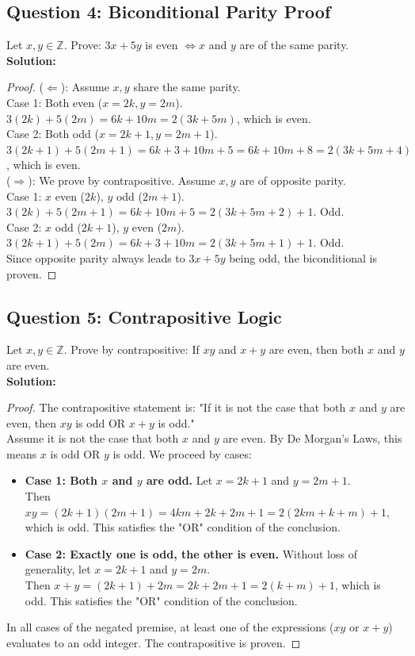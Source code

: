 \documentclass[11pt]{article}
\begin{document}
\subsection*{Question 4: Biconditional Parity Proof}
Let $x,y \in \mathbb{Z}$. Prove: $3x + 5y$ is even $\Leftrightarrow x$ and $y$ are of the same parity.\\
\textbf{Solution:}
\begin{proof}
($\Leftarrow$): Assume $x,y$ share the same parity. \\
Case 1: Both even ($x=2k, y=2m$). $3(2k) + 5(2m) = 6k + 10m = 2(3k + 5m)$, which is even. \\
Case 2: Both odd ($x=2k+1, y=2m+1$). $3(2k+1) + 5(2m+1) = 6k + 3 + 10m + 5 = 6k + 10m + 8 = 2(3k + 5m + 4)$, which is even. \\
($\Rightarrow$): We prove by contrapositive. Assume $x,y$ are of opposite parity. \\
Case 1: $x$ even ($2k$), $y$ odd ($2m+1$). $3(2k) + 5(2m+1) = 6k + 10m + 5 = 2(3k+5m+2)+1$. Odd. \\
Case 2: $x$ odd ($2k+1$), $y$ even ($2m$). $3(2k+1) + 5(2m) = 6k + 3 + 10m = 2(3k+5m+1)+1$. Odd. \\
Since opposite parity always leads to $3x+5y$ being odd, the biconditional is proven.
\end{proof}

\subsection*{Question 5: Contrapositive Logic}
Let $x,y \in \mathbb{Z}$. Prove by contrapositive: If $xy$ and $x+y$ are even, then both $x$ and $y$ are even.\\
\textbf{Solution:}
\begin{proof}
The contrapositive statement is: "If it is not the case that both $x$ and $y$ are even, then $xy$ is odd OR $x+y$ is odd." \\
Assume it is not the case that both $x$ and $y$ are even. By De Morgan's Laws, this means $x$ is odd OR $y$ is odd. We proceed by cases:
\begin{itemize}
    \item \textbf{Case 1: Both $x$ and $y$ are odd.} Let $x=2k+1$ and $y=2m+1$. \\
    Then $xy = (2k+1)(2m+1) = 4km+2k+2m+1 = 2(2km+k+m)+1$, which is odd. This satisfies the "OR" condition of the conclusion.
    \item \textbf{Case 2: Exactly one is odd, the other is even.} Without loss of generality, let $x=2k+1$ and $y=2m$. \\
    Then $x+y = (2k+1) + 2m = 2k+2m+1 = 2(k+m)+1$, which is odd. This satisfies the "OR" condition of the conclusion.
\end{itemize}
In all cases of the negated premise, at least one of the expressions ($xy$ or $x+y$) evaluates to an odd integer. The contrapositive is proven.
\end{proof}
\end{document}
